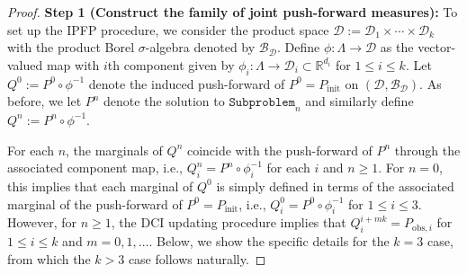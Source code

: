 \documentclass{article}
\newcommand{\B}{\mathcal{B}}
\newcommand{\tmw}[1]{{\color{red} #1}}
\newcommand{\initmeas}{P_{\text{init}}}
\begin{document}
\begin{proof}
{\bf Step 1 (Construct the family of joint push-forward measures):} 
To set up the IPFP procedure, we consider the product space $\mathcal{D}:=\mathcal{D}_{1} \times \cdots \times \mathcal{D}_{k}$ with the product Borel $\sigma$-algebra denoted by $\B_\mathcal{D}$.
Define $\phi:\Lambda\to\mathcal{D}$ as the vector-valued map with $i$th component given by $\phi_i:\Lambda\to\mathcal{D}_i\subset\mathbb{R}^{d_i}$ for $1\leq i\leq k$. 
Let $Q^0:=P^0\circ\phi^{-1}$ denote the induced push-forward of $P^0=\initmeas$ on $(\mathcal{D},\B_\mathcal{D})$. 
As before, we let $P^n$ denote the solution to $\mathtt{Subproblem}_n$ and similarly define $Q^n:=P^n\circ \phi^{-1}$. 

For each $n$, the marginals of $Q^n$ coincide with the push-forward of $P^n$ through the associated component map, i.e., $Q^n_{i} = P^n\circ \phi_i^{-1}$ for each $i$ and $n\geq 1$.
For $n=0$, this implies that each marginal of $Q^0$ is simply defined in terms of the associated marginal of the push-forward of $P^0=\initmeas$, i.e.,  $Q_{i}^{0} = P^0\circ\phi_i^{-1}$ 
for $1\leq i\leq 3$.
However, for $n\geq 1$, the DCI updating procedure implies that $Q^{i+mk}_{i} = P_{\text{obs},i}$ for $1\leq i\leq k$ and $m=0,1,\ldots$. 
Below, we show the specific details for the $k=3$ case, from which the $k>3$ case follows naturally.


\end{proof}
\end{document}
